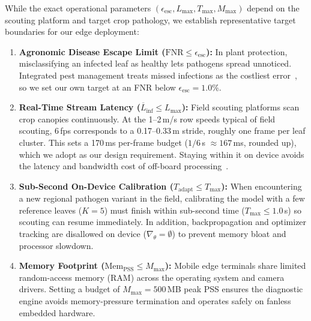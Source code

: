 While the exact operational parameters $(\epsilon_{\text{esc}}, L_{\max}, T_{\max}, M_{\max})$ depend on the scouting platform and target crop pathology, we establish representative target boundaries for our edge deployment:
\begin{enumerate}
    \item \textbf{Agronomic Disease Escape Limit ($\text{FNR} \le \epsilon_{\text{esc}}$):} In plant protection, misclassifying an infected leaf as healthy lets pathogens spread unnoticed. Integrated pest management treats missed infections as the costliest error~\cite{richard2022control}, so we set our own target at an FNR below $\epsilon_{\text{esc}} = 1.0\%$.
    \item \textbf{Real-Time Stream Latency ($\overline{L}_{\text{inf}} \le L_{\max}$):} Field scouting platforms scan crop canopies continuously. At the 1--2\,m/s row speeds typical of field scouting, 6\,fps corresponds to a 0.17--0.33\,m stride, roughly one frame per leaf cluster. This sets a 170\,ms per-frame budget ($1/6$\,s $\approx 167$\,ms, rounded up), which we adopt as our design requirement. Staying within it on device avoids the latency and bandwidth cost of off-board processing~\cite{radocaj2025evolution}.
    \item \textbf{Sub-Second On-Device Calibration ($T_{\text{adapt}} \le T_{\max}$):} When encountering a new regional pathogen variant in the field, calibrating the model with a few reference leaves ($K=5$) must finish within sub-second time ($T_{\max} \le 1.0$\,s) so scouting can resume immediately. In addition, backpropagation and optimizer tracking are disallowed on device ($\nabla_\theta = \emptyset$) to prevent memory bloat and processor slowdown.
    \item \textbf{Memory Footprint ($\text{Mem}_{\text{PSS}} \le M_{\max}$):} Mobile edge terminals share limited random-access memory (RAM) across the operating system and camera drivers. Setting a budget of $M_{\max} = 500$\,MB peak PSS ensures the diagnostic engine avoids memory-pressure termination and operates safely on fanless embedded hardware.
\end{enumerate}

